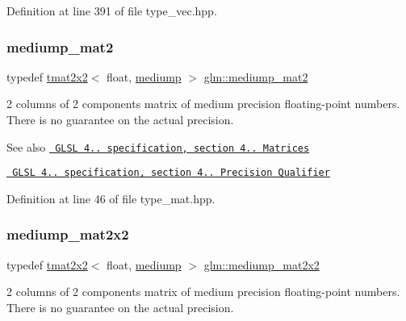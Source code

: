 Definition at line 391 of file type\+\_\+vec.\+hpp.

\mbox{\label{group__core__precision_ga3b83486a767447bf1b36bbf32e589bac}} 
\subsubsection{\texorpdfstring{mediump\_mat2}{mediump\_mat2}}
{\footnotesize\ttfamily typedef \mbox{\hyperlink{structglm_1_1tmat2x2}{tmat2x2}}$<$ float, \mbox{\hyperlink{namespaceglm_a0f04f086094c747d227af4425893f545a6416f3ea0c9025fb21ed50c4d6620482}{mediump}} $>$ \mbox{\hyperlink{group__core__precision_ga3b83486a767447bf1b36bbf32e589bac}{glm\+::mediump\+\_\+mat2}}}

2 columns of 2 components matrix of medium precision floating-\/point numbers. There is no guarantee on the actual precision.

\begin{DoxySeeAlso}{See also}
\href{http://www.opengl.org/registry/doc/GLSLangSpec.4.20.8.pdf}{\texttt{ G\+L\+SL 4.. specification, section 4.. Matrices}} 

\href{http://www.opengl.org/registry/doc/GLSLangSpec.4.20.8.pdf}{\texttt{ G\+L\+SL 4.. specification, section 4.. Precision Qualifier}} 
\end{DoxySeeAlso}


Definition at line 46 of file type\+\_\+mat.\+hpp.

\mbox{\label{group__core__precision_ga7f27d5d720010e94d8a98eaaaf7f1f32}} 
\subsubsection{\texorpdfstring{mediump\_mat2x2}{mediump\_mat2x2}}
{\footnotesize\ttfamily typedef \mbox{\hyperlink{structglm_1_1tmat2x2}{tmat2x2}}$<$ float, \mbox{\hyperlink{namespaceglm_a0f04f086094c747d227af4425893f545a6416f3ea0c9025fb21ed50c4d6620482}{mediump}} $>$ \mbox{\hyperlink{group__core__precision_ga7f27d5d720010e94d8a98eaaaf7f1f32}{glm\+::mediump\+\_\+mat2x2}}}

2 columns of 2 components matrix of medium precision floating-\/point numbers. There is no guarantee on the actual precision.

